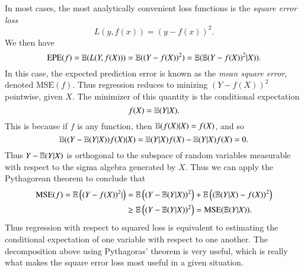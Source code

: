 \begin{example}
	In most cases, the most analytically convenient loss functions is the \emph{square error loss}
	\[ L(y,f(x)) = (y - f(x))^2. \]
	We then have
	\[ \text{EPE}(f) = \operatorname{\mathbb{E}}(L(Y,f(X))) = \operatorname{\mathbb{E}}((Y - f(X))^2) = \operatorname{\mathbb{E}}(\operatorname{\mathbb{E}}(Y - f(X))^2 | X)). \]
	In this case, the expected prediction error is known as the \emph{mean square error}, denoted $\text{MSE}(f)$. Thus regression reduces to minizing $(Y - f(X))^2$ pointwise, given $X$. The minimizer of this quantity is the conditional expectation
	\[ f(X) = \operatorname{\mathbb{E}}(Y|X). \]
	This is because if $f$ is any function, then $\operatorname{\mathbb{E}}(f(X)|X) = f(X)$, and so
	\[ \operatorname{\mathbb{E}}((Y - \operatorname{\mathbb{E}}(Y|X))f(X)|X) = \operatorname{\mathbb{E}}(Y|X) f(X) - \operatorname{\mathbb{E}}(Y|X) f(X) = 0. \]
	Thus $Y - \operatorname{\mathbb{E}}(Y|X)$ is orthogonal to the subspace of random variables measurable with respect to the sigma algebra generated by $X$. Thus we can apply the Pythagorean theorem to conclude that
	\begin{align*}
		\text{MSE}(f) = \operatorname{\mathbb{E}} \left( (Y - f(X))^2 | \right) &= \operatorname{\mathbb{E}} \left((Y - \operatorname{\mathbb{E}}(Y|X))^2 \right) + \operatorname{\mathbb{E}} \left( (\operatorname{\mathbb{E}}(Y|X) - f(X))^2 \right)\\
		&\geq \operatorname{\mathbb{E}} \left( (Y - \operatorname{\mathbb{E}}(Y|X))^2 \right) = \text{MSE}(\operatorname{\mathbb{E}}(Y|X)).
	\end{align*}
	Thus regression with respect to squared loss is equivalent to estimating the conditional expectation of one variable with respect to one another. The decomposition above using Pythagoras' theorem is very useful, which is really what makes the square error loss most useful in a given situation.
\end{example}

